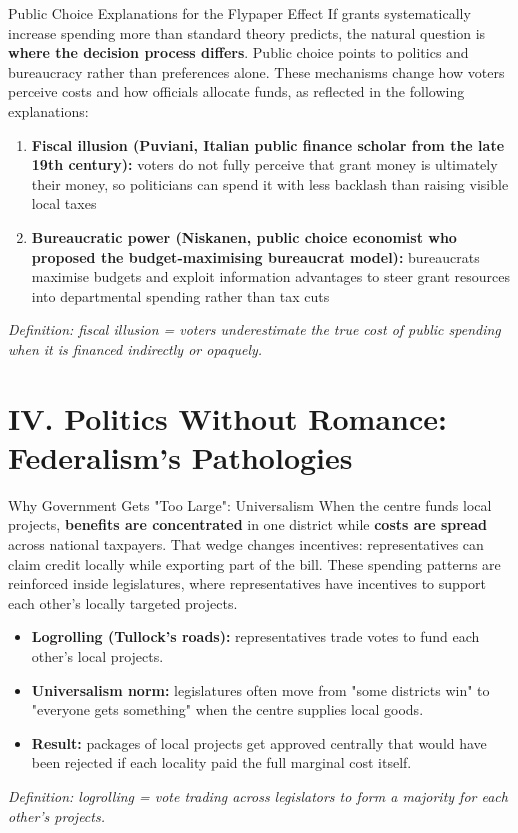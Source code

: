\documentclass[10pt]{beamer}
\begin{document}
\begin{frame}{Public Choice Explanations for the Flypaper Effect}
If grants systematically increase spending more than standard theory predicts, the natural question is \textbf{where the decision process differs}.
Public choice points to politics and bureaucracy rather than preferences alone. These mechanisms change how voters perceive costs and how officials allocate funds, as reflected in the following explanations:


\begin{enumerate}
\item \textbf{Fiscal illusion (Puviani, Italian public finance scholar from the late 19th century):} voters do not fully perceive that grant money is ultimately their money, so politicians can spend it with less backlash than raising visible local taxes
\item \textbf{Bureaucratic power (Niskanen, public choice economist who proposed the budget-maximising bureaucrat model):} bureaucrats maximise budgets and exploit information advantages to steer grant resources into departmental spending rather than tax cuts
\end{enumerate}

\vspace{0.1cm}
\footnotesize
\textit{Definition: fiscal illusion = voters underestimate the true cost of public spending when it is financed indirectly or opaquely.}
\end{frame}


\section{IV. Politics Without Romance: Federalism's Pathologies}

\begin{frame}{Why Government Gets "Too Large": Universalism}
When the centre funds local projects, \textbf{benefits are concentrated} in one district while \textbf{costs are spread} across national taxpayers.
That wedge changes incentives: representatives can claim credit locally while exporting part of the bill. These spending patterns are reinforced inside legislatures, where representatives have incentives to support each other’s locally targeted projects.


\begin{itemize}
\item \textbf{Logrolling (Tullock’s roads):} representatives trade votes to fund each other’s local projects.
\item \textbf{Universalism norm:} legislatures often move from "some districts win" to "everyone gets something" when the centre supplies local goods.
\item \textbf{Result:} packages of local projects get approved centrally that would have been rejected if each locality paid the full marginal cost itself.
\end{itemize}

\vspace{0.1cm}
\footnotesize
\textit{Definition: logrolling = vote trading across legislators to form a majority for each other’s projects.}
\end{frame}
\end{document}
